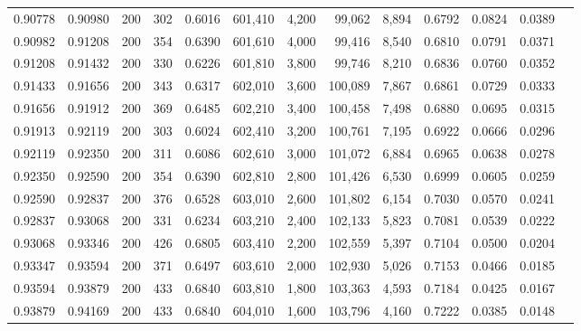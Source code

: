 \begin{tabular}{rrrrrrrrrrrrr}
0.90778 & 0.90980 &    200 & 302 &                                     0.6016 & 601,410 &   4,200 &  99,062 &   8,894 & 0.6792 & 0.0824 & 0.0389 \\
0.90982 & 0.91208 &    200 & 354 &                                     0.6390 & 601,610 &   4,000 &  99,416 &   8,540 & 0.6810 & 0.0791 & 0.0371 \\
0.91208 & 0.91432 &    200 & 330 &                                     0.6226 & 601,810 &   3,800 &  99,746 &   8,210 & 0.6836 & 0.0760 & 0.0352 \\
0.91433 & 0.91656 &    200 & 343 &                                     0.6317 & 602,010 &   3,600 & 100,089 &   7,867 & 0.6861 & 0.0729 & 0.0333 \\
0.91656 & 0.91912 &    200 & 369 &                                     0.6485 & 602,210 &   3,400 & 100,458 &   7,498 & 0.6880 & 0.0695 & 0.0315 \\
0.91913 & 0.92119 &    200 & 303 &                                     0.6024 & 602,410 &   3,200 & 100,761 &   7,195 & 0.6922 & 0.0666 & 0.0296 \\
0.92119 & 0.92350 &    200 & 311 &                                     0.6086 & 602,610 &   3,000 & 101,072 &   6,884 & 0.6965 & 0.0638 & 0.0278 \\
0.92350 & 0.92590 &    200 & 354 &                                     0.6390 & 602,810 &   2,800 & 101,426 &   6,530 & 0.6999 & 0.0605 & 0.0259 \\
0.92590 & 0.92837 &    200 & 376 &                                     0.6528 & 603,010 &   2,600 & 101,802 &   6,154 & 0.7030 & 0.0570 & 0.0241 \\
0.92837 & 0.93068 &    200 & 331 &                                     0.6234 & 603,210 &   2,400 & 102,133 &   5,823 & 0.7081 & 0.0539 & 0.0222 \\
0.93068 & 0.93346 &    200 & 426 &                                     0.6805 & 603,410 &   2,200 & 102,559 &   5,397 & 0.7104 & 0.0500 & 0.0204 \\
0.93347 & 0.93594 &    200 & 371 &                                     0.6497 & 603,610 &   2,000 & 102,930 &   5,026 & 0.7153 & 0.0466 & 0.0185 \\
0.93594 & 0.93879 &    200 & 433 &                                     0.6840 & 603,810 &   1,800 & 103,363 &   4,593 & 0.7184 & 0.0425 & 0.0167 \\
0.93879 & 0.94169 &    200 & 433 &                                     0.6840 & 604,010 &   1,600 & 103,796 &   4,160 & 0.7222 & 0.0385 & 0.0148 \\

\end{tabular}
